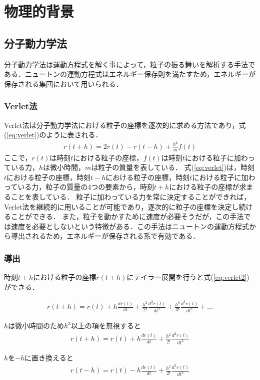 \chapter{物理的背景}
\section{分子動力学法}
分子動力学法は運動方程式を解く事によって，粒子の振る舞いを解析する手法である\cite{MD}．ニュートンの運動方程式はエネルギー保存則を満たすため，エネルギーが保存される集団において用いられる．
\subsection{Verlet法}
Verlet法は分子動力学法における粒子の座標を逐次的に求める方法であり，式(\ref{eq:verlet})のように表される．
\begin{eqnarray}
\label{eq:verlet}
r(t+h)=2r(t)-r(t-h)+\frac{h^2}{m}f(t)
\end{eqnarray}
ここで，$r(t)$は時刻$t$における粒子の座標，$f(t)$は時刻$t$における粒子に加わっている力，$h$は微小時間，$m$は粒子の質量を表している．
式(\ref{eq:verlet})は，時刻$t$における粒子の座標，時刻$t-h$における粒子の座標，時刻$t$における粒子に加わっている力，粒子の質量の4つの要素から，時刻$t+h$における粒子の座標が求まることを表している．
粒子に加わっている力を常に決定することができれば，Verlet法を継続的に用いることが可能であり，逐次的に粒子の座標を決定し続けることができる．
また，粒子を動かすために速度が必要そうだが，この手法では速度を必要としないという特徴がある．この手法はニュートンの運動方程式から導出されるため，エネルギーが保存される系で有効である．


\subsection{導出}
時刻$t+h$における粒子の座標$r(t+h)$にテイラー展開を行うと式(\ref{eq:verlet2})ができる．

\begin{eqnarray}
\label{eq:verlet2}
r(t+h)=r(t)+h\frac{dr(t)}{dt}+\frac{h^2}{2!}\frac{d^2r(t)}{dt^2}+\frac{h^3}{3!}\frac{d^3r(t)}{dt^3}+...
\end{eqnarray}

$h$は微小時間のため$h^3$以上の項を無視すると
\begin{eqnarray}
\label{eq:verlet5}
r(t+h)=r(t)+h\frac{dr(t)}{dt}+\frac{h^2}{2!}\frac{d^2r(t)}{dt^2}
\end{eqnarray}

$h$を$-h$に置き換えると
\begin{eqnarray}
\label{eq:verlet6}
r(t-h)=r(t)-h\frac{dr(t)}{dt}+\frac{h^2}{2!}\frac{d^2r(t)}{dt^2}
\end{eqnarray}

